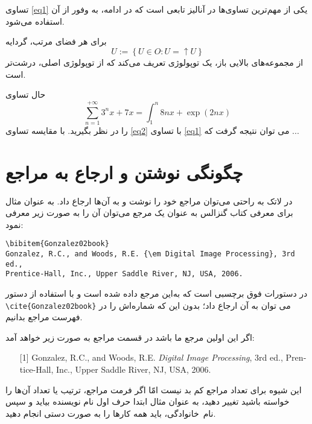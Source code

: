 تساوی \eqref{eq1} یکی از مهم‌‌ترین تساوی‌ها در آنالیز تابعی است که در ادامه، به وفور از آن استفاده می‌شود.

\begin{example}
برای هر فضای مرتب، گردایه 
$$U:=\left\lbrace U\in O: U=\uparrow U\right\rbrace $$
از مجموعه‌های بالایی باز، یک توپولوژی تعریف می‌کند که از توپولوژی اصلی، درشت‌تر  است.
\end{example}
حال تساوی 
\begin{equation}\label{eq2}
\sum_{n=1}^{+\infty} 3^{n}x+7x=\int_{1}^{n}8nx+\exp{(2nx)}
\end{equation}
را در نظر بگیرید. با مقایسه تساوی \eqref{eq2} با تساوی \eqref{eq1} می توان نتیجه گرفت که ...


\section{چگونگی نوشتن و ارجاع به مراجع}\label{Sec:Ref}

در لاتک به راحتی می‌توان مراجع خود را نوشت و به آن‌ها ارجاع داد. به عنوان مثال برای معرفی کتاب گنزالس \cite{Gonzalez02book} به عنوان یک مرجع 
می‌توان آن را به صورت زیر معرفی نمود:
\begin{LTR}
\begin{Verbatim}
\bibitem{Gonzalez02book}
Gonzalez, R.C., and Woods, R.E. {\em Digital Image Processing}, 3rd ed.,
Prentice-Hall, Inc., Upper Saddle River, NJ, USA, 2006.
\end{Verbatim}
\end{LTR}

در دستورات فوق   برچسبی است که به‌این مرجع داده شده است و با استفاده از دستور \Verb!\cite{Gonzalez02book}!
می توان به آن ارجاع داد؛ بدون این که شماره‌اش را در فهرست مراجع بدانیم.

اگر این اولین مرجع ما باشد در قسمت مراجع به صورت زیر خواهد آمد:\\
\begin{latin}
\begin{enumerate}
    \item [{[1]}] Gonzalez, R.C., and Woods, R.E. {\em Digital Image Processing}, 3rd ed.,
    Prentice-Hall, Inc., Upper Saddle River, NJ, USA, 2006.
\end{enumerate}
\end{latin}

این شیوه برای تعداد مراجع کم بد نیست امّا اگر فرمت مراجع، ترتیب یا تعداد آن‌ها را خواسته باشید تغییر دهید، به عنوان مثال ابتدا حرف اول نام نویسنده بیاید 
و سپس نام~خانوادگی، باید همه کارها را به صورت دستی انجام دهید.

